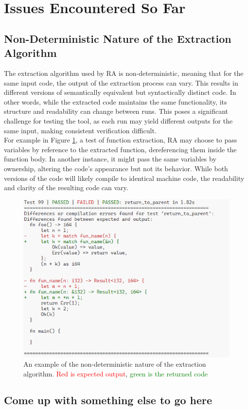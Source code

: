 \section{Issues Encountered So Far}

\subsection*{Non-Deterministic Nature of the Extraction Algorithm}

The extraction algorithm used by RA is non-deterministic,
meaning that for the same input code, the output of the extraction process can
vary. This results in different versions of semantically equivalent but
syntactically distinct code. In other words, while the extracted code maintains
the same functionality, its structure and readability can change between runs.
This poses a significant challenge for testing the tool, as each run may yield
different outputs for the same input, making consistent verification difficult. \\
For example in Figure \ref{fig:issue1}, a test of function extraction, RA may choose to pass
variables by reference to the extracted function, dereferencing them inside the
function body. In another instance, it might pass the same variables by
ownership, altering the code's appearance but not its behavior. While both
versions of the code will likely compile to identical machine code, the
readability and clarity of the resulting code can vary.

\begin{figure}[H]
    \centering
    \includegraphics[width=\columnwidth]{Figures/issue_1.png}
    \caption{An example of the non-deterministic nature of the extraction
    algorithm. \textcolor{red}{Red is expected output}, \textcolor{green}{green is the
    returned code}}
    \label{fig:issue1}
\end{figure}

\subsection*{Come up with something else to go here}